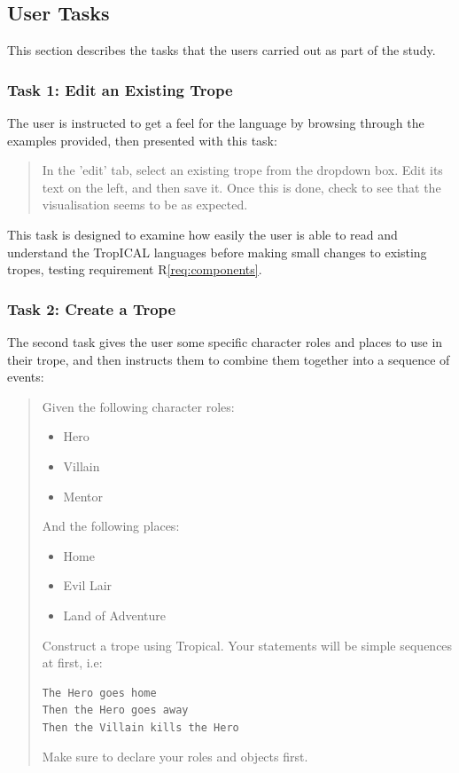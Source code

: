 \documentclass[11pt]{report}
\begin{document}
\subsection{User Tasks}
\label{sec:user-tasks}
This section describes the tasks that the users carried out as part of the study.

\subsubsection*{Task 1: Edit an Existing Trope}
\label{sec:org14aee76}
The user is instructed to get a feel for the language by browsing through
the examples provided, then presented with this task:

\begin{framed}
\begin{quote}
In the 'edit' tab, select an existing trope from the dropdown box. Edit its text on the left, and then save it. Once this is done, check to see that the visualisation seems to be as expected.
\end{quote}
\end{framed}

This task is designed to examine how easily the user is able to read and
understand the TropICAL languages before making small changes to existing
tropes, testing requirement R\ref{req:components}.

\subsubsection*{Task 2: Create a Trope}
\label{sec:org96a6276}

The second task gives the user some specific character roles and places to use
in their trope, and then instructs them to combine them together into a sequence
of events:

\begin{framed}
\begin{quote}
Given the following character roles:

\begin{itemize}
\item Hero
\item Villain
\item Mentor
\end{itemize}

And the following places:

\begin{itemize}
\item Home
\item Evil Lair
\item Land of Adventure
\end{itemize}

Construct a trope using Tropical. Your statements will be simple sequences at first, i.e:

\begin{verbatim}
The Hero goes home
Then the Hero goes away
Then the Villain kills the Hero
\end{verbatim}

Make sure to declare your roles and objects first.
\end{quote}
\end{framed}
\end{document}
